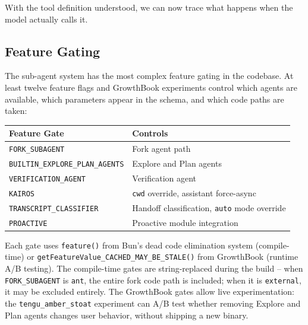 \documentclass[
  english,
  11pt,
  letterpaper,
]{book}
\begin{document}
With the tool definition understood, we can now trace what happens when
the model actually calls it.

\subsection{Feature Gating}\label{feature-gating}

The sub-agent system has the most complex feature gating in the
codebase. At least twelve feature flags and GrowthBook experiments
control which agents are available, which parameters appear in the
schema, and which code paths are taken:

\begin{longtable}[]{@{}
  >{\raggedright\arraybackslash}p{}
  >{\raggedright\arraybackslash}p{}@{}}
\toprule\noalign{}
\begin{minipage}[b]{\linewidth}\raggedright
Feature Gate
\end{minipage} & \begin{minipage}[b]{\linewidth}\raggedright
Controls
\end{minipage} \\
\midrule\noalign{}
\endhead
\bottomrule\noalign{}
\endlastfoot
\texttt{FORK\_SUBAGENT} & Fork agent path \\
\texttt{BUILTIN\_EXPLORE\_PLAN\_AGENTS} & Explore and Plan agents \\
\texttt{VERIFICATION\_AGENT} & Verification agent \\
\texttt{KAIROS} & \texttt{cwd} override, assistant force-async \\
\texttt{TRANSCRIPT\_CLASSIFIER} & Handoff classification, \texttt{auto}
mode override \\
\texttt{PROACTIVE} & Proactive module integration \\
\end{longtable}

Each gate uses \texttt{feature()} from Bun's dead code elimination
system (compile-time) or
\texttt{getFeatureValue\_CACHED\_MAY\_BE\_STALE()} from GrowthBook
(runtime A/B testing). The compile-time gates are string-replaced during
the build -- when \texttt{FORK\_SUBAGENT} is
\texttt{\textquotesingle{}ant\textquotesingle{}}, the entire fork code
path is included; when it is
\texttt{\textquotesingle{}external\textquotesingle{}}, it may be
excluded entirely. The GrowthBook gates allow live experimentation: the
\texttt{tengu\_amber\_stoat} experiment can A/B test whether removing
Explore and Plan agents changes user behavior, without shipping a new
binary.
\end{document}
